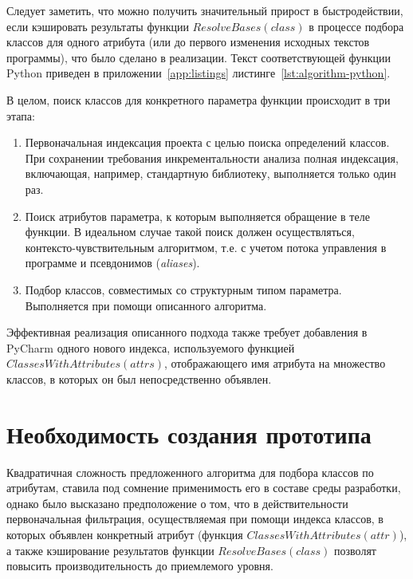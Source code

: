Следует заметить, что можно получить значительный прирост в быстродействии, если
кэшировать результаты функции $ResolveBases(class)$ в процессе подбора классов
для одного атрибута (или до первого изменения исходных текстов программы), что
было сделано в реализации. Текст соответствующей функции Python приведен в
приложении~\ref{app:listings} листинге~\ref{lst:algorithm-python}.

В целом, поиск классов для конкретного параметра функции происходит в три этапа:

\begin{enumerate}
    \item Первоначальная индексация проекта с целью поиска определений классов.
      При сохранении требования инкрементальности анализа полная индексация,
      включающая, например, стандартную библиотеку, выполняется только один раз.

    \item Поиск атрибутов параметра, к которым выполняется обращение в теле
        функции. В идеальном случае такой поиск должен осуществляться,
        контексто-чувствительным алгоритмом, т.е. с учетом потока управления в
        программе и псевдонимов (\emph{aliases}).

    \item Подбор классов, совместимых со структурным типом параметра.
      Выполняется при помощи описанного алгоритма.

  \end{enumerate}

Эффективная реализация описанного подхода также требует добавления в PyCharm одного нового
индекса, используемого функцией $ClassesWithAttributes(attrs)$, отображающего
имя атрибута на множество классов, в которых он был непосредственно объявлен. 

\section{Необходимость создания прототипа}
\label{sec:prototype-necessity}

Квадратичная сложность предложенного алгоритма для подбора классов по атрибутам,
ставила под сомнение применимость его в составе среды разработки, однако было
высказано предположение о том, что в действительности первоначальная фильтрация,
осуществляемая при помощи индекса классов, в которых объявлен конкретный
атрибут (функция $ClassesWithAttributes(attr)$), а также кэширование результатов
функции $ResolveBases(class)$ позволят повысить производительность до
приемлемого уровня.

